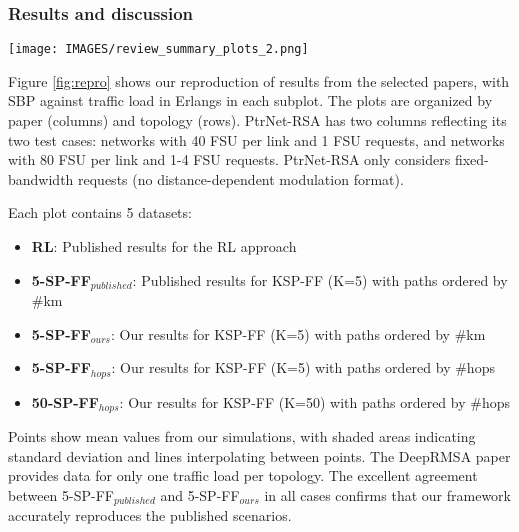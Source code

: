 \subsubsection{Results and discussion}


\begin{figure*}[ht]
  \texttt{[image: IMAGES/review\_summary\_plots\_2.png]}
  \caption{Mean SBP against traffic load. Each column is a publication and each subplot is for a topology. Error bars and shaded areas show standard deviations. %
  \mbox{50-SP-FF$_{hops}$} exceeds or matches the $RL$ performance for each case.}
  \label{fig:repro}
\end{figure*}

Figure \ref{fig:repro} shows our reproduction of results from the selected papers, with SBP against traffic load in Erlangs in each subplot. The plots are organized by paper (columns) and topology (rows). PtrNet-RSA has two columns reflecting its two test cases: networks with 40 FSU per link and 1 FSU requests, and networks with 80 FSU per link and 1-4 FSU requests. PtrNet-RSA only considers fixed-bandwidth requests (no distance-dependent modulation format).

Each plot contains 5 datasets:
\begin{itemize}[itemsep=0pt]
\item[] \textbf{RL}: Published results for the RL approach
\item[] \textbf{5-SP-FF$_{published}$}: Published results for KSP-FF (K=5) with paths ordered by \#km
\item[] \textbf{5-SP-FF$_{ours}$}: Our results for KSP-FF (K=5) with paths ordered by \#km
\item[] \textbf{5-SP-FF$_{hops}$}: Our results for KSP-FF (K=5) with paths ordered by \#hops
\item[] \textbf{50-SP-FF$_{hops}$}: Our results for KSP-FF (K=50) with paths ordered by \#hops
\end{itemize}

Points show mean values from our simulations, with shaded areas indicating standard deviation and lines interpolating between points. The DeepRMSA paper provides data for only one traffic load per topology. The excellent agreement between 5-SP-FF$_{published}$ and 5-SP-FF$_{ours}$ in all cases confirms that our framework accurately reproduces the published scenarios. %


